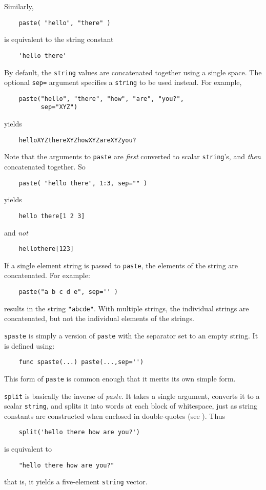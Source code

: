 Similarly,
\begin{verbatim}
    paste( "hello", "there" )
\end{verbatim}
is equivalent to the string constant
\begin{verbatim}
    'hello there'
\end{verbatim}

By default, the {\tt string} values are concatenated together using a
single space.  The optional {\tt sep=} argument specifies
a {\tt string} to be used instead.  For example,
\begin{verbatim}
    paste("hello", "there", "how", "are", "you?",
          sep="XYZ")
\end{verbatim}
yields
\begin{verbatim}
    helloXYZthereXYZhowXYZareXYZyou?
\end{verbatim}

Note that the arguments to {\tt paste} are {\em first} converted to scalar
{\tt string}'s, and {\em then} concatenated together.  So
\begin{verbatim}
    paste( "hello there", 1:3, sep="" )
\end{verbatim}
yields
\begin{verbatim}
    hello there[1 2 3]
\end{verbatim}
and {\em not}
\begin{verbatim}
    hellothere[123]
\end{verbatim}

If a single element string is passed to {\tt paste}, the elements of the string are
concatenated. For example:
\begin{verbatim}
    paste("a b c d e", sep='' )
\end{verbatim}
results in the string {\tt "abcde"}. With multiple strings, the individual
strings are concatenated, but not the individual elements of the strings.

{\tt spaste} \label{spaste-func} 
is simply a version of {\tt paste} with the separator
set to an empty string.  It is defined using:
\begin{verbatim}
    func spaste(...) paste(...,sep='')
\end{verbatim}
This form of {\tt paste} is common enough that it merits its own simple
form.

{\tt split} \label{split-func} 
is basically the inverse of {\em paste}.  It takes a single
argument, converts it to a scalar {\tt string}, and splits it into words
at each block of whitespace, just as string constants are constructed
when enclosed in double-quotes (see ).
Thus
\begin{verbatim}
    split('hello there how are you?')
\end{verbatim}
is equivalent to
\begin{verbatim}
    "hello there how are you?"
\end{verbatim}
that is, it yields a five-element {\tt string} vector.

